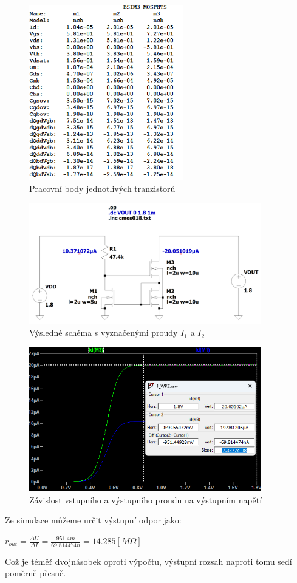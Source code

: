 \begin{figure}[h!]
    \centering
    \includegraphics[width=0.6\textwidth]{text/img/WPZ-op-OL.png}
    \caption{\label{fig:WPZ-op-OL} Pracovní body jednotlivých tranzistorů}
\end{figure}

\begin{figure}[h!]
    \centering
    \includegraphics[width=0.9\textwidth]{text/img/WPZ-op-sch.png}
    \caption{\label{fig:WPZ-op-sch} Výsledné schéma s vyznačenými proudy \(I_1\) a \(I_2\)}
\end{figure}

\begin{figure}[h!]
    \centering
    \includegraphics[width=0.9\textwidth]{text/img/WPZ-dc-graf.png}
    \caption{\label{fig:WPZ-dc-graf} Závislost vstupního a výstupního proudu na výstupním napětí}
\end{figure}

Ze simulace můžeme určit výstupní odpor jako:
\begin{center}
    \large
    \(
        r_{out} = \frac{\Delta U}{\Delta I} = \frac{951.4m}{69.814474n} = 14.285 [M\Omega] 
    \)
\end{center}

Což je téměř dvojnásobek oproti výpočtu, výstupní rozsah naproti tomu sedí poměrně přesně.